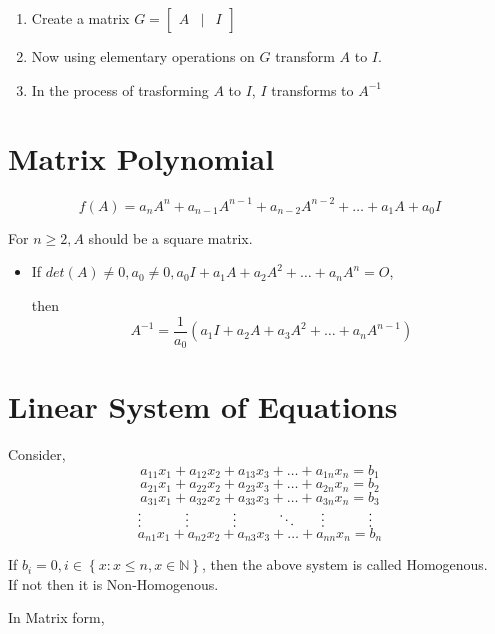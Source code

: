\documentclass{article}
\begin{document}
\begin{enumerate}[1.]
    \item Create a matrix $G=\begin{bmatrix}
                  A & | & I
              \end{bmatrix}$
    \item Now using elementary operations on $G$ transform $A$ to $I$.
    \item In the process of trasforming $A$ to $I$, $I$ transforms to $A^{-1}$
\end{enumerate}

\section{Matrix Polynomial}
$$f(A)=a_{n}A^n+a_{n-1}A^{n-1}+a_{n-2}A^{n-2}+ \ldots +a_{1}A+a_{0}I$$

For $n \ge 2, A$ should be a square matrix.

\begin{itemize}
    \item If $det(A) \not= 0, a_{0}\not=0, a_{0}I+a_{1}A+a_{2}A^2+ \ldots + a_{n}A^n=O$,

          then $$A^{-1}=\dfrac{1}{a_{0}}\left(
              a_{1}I+a_{2}A+a_{3}A^2+ \ldots + a_{n}A^{n-1}
              \right)$$
\end{itemize}

\section{Linear System of Equations}
Consider,
$$a_{11}x_{1}+a_{12}x_{2}+a_{13}x_{3}+ \ldots + a_{1n}x_{n}=b_{1}$$
$$a_{21}x_{1}+a_{22}x_{2}+a_{23}x_{3}+ \ldots + a_{2n}x_{n}=b_{2}$$
$$a_{31}x_{1}+a_{32}x_{2}+a_{33}x_{3}+ \ldots + a_{3n}x_{n}=b_{3}$$
$\hphantom{1cm} \hspace{2.6cm} \vdots \hspace{1.1cm} \vdots \hspace{1.1cm} \vdots \hspace{1.0cm} \ddots \hspace{0.6cm} \vdots \hspace{1.1cm} \vdots$
$$a_{n1}x_{1}+a_{n2}x_{2}+a_{n3}x_{3}+ \ldots + a_{nn}x_{n}=b_{n}$$

If $b_{i}=0,i\in \left\{x:x\le n, x \in \mathbb{N}\right\}$, then the above system is called Homogenous. \\If not then it is Non-Homogenous.

In Matrix form,
\end{document}
